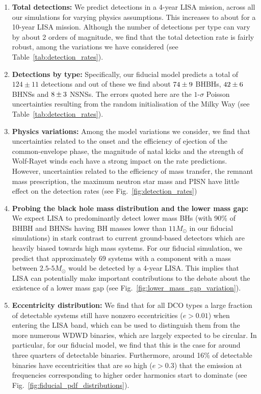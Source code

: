 \begin{enumerate}
    \item \textbf{Total detections:} We predict \rangeFourYear{} detections in a 4-year LISA mission, across all our simulations for varying physics assumptions. This increases to about \rangeTenYear{} for a 10-year LISA mission. Although the number of detections per type can vary by about 2 orders of magnitude, we find that the total detection rate is fairly robust, among the variations we have considered (see Table~\ref{tab:detection_rates}).
    
     \item \textbf{Detections by type:} Specifically, our fiducial model predicts a total of $124 \pm 11$ detections and out of these we find about $74{}\pm 9$ BHBHs, $42{}\pm 6$ BHNSs and $8{}\pm 3$ NSNSs. The errors quoted here are the $1$-$\sigma$ Poisson uncertainties resulting from the random initialisation of the Milky Way (see Table~\ref{tab:detection_rates}).
    
    \item \textbf{Physics variations:}  Among the model variations we consider, we find that uncertainties related to the onset and the efficiency of ejection of the common-envelope phase, the magnitude of natal kicks and the strength of Wolf-Rayet winds each have a strong impact on the rate predictions. However, uncertainties related to the efficiency of mass transfer, the remnant mass prescription, the maximum neutron star mass and PISN have little effect on the detection rates (see Fig.~\ref{fig:detection_rates})
    
    \item \textbf{Probing the black hole mass distribution and the lower mass gap:} We expect LISA to predominantly detect lower mass BHs (with 90\% of BHBH and BHNSs having BH masses lower than $11 \unit{M_\odot}$ in our fiducial simulations) in stark contrast to current ground-based detectors which are heavily biased towards high mass systems. For our fiducial simulation, we predict that approximately 69 systems with a component with a mass between $2.5$-$5 \unit{M_\odot}$ would be detected by a 4-year LISA. This implies that LISA can potentially make important contributions to the debate about the existence of a lower mass gap (see Fig.~\ref{fig:lower_mass_gap_variation}).
    
    \item \textbf{Eccentricity distribution:} We find that for all DCO types a large fraction of detectable systems still have nonzero eccentricities ($e > 0.01$) when entering the LISA band, which can be used to distinguish them from the more numerous WDWD binaries, which are largely expected to be circular. In particular, for our fiducial model, we find that this is the case for around three quarters of detectable binaries. Furthermore, around 16\% of detectable binaries have eccentricities that are so high ($e > 0.3$) that the emission at frequencies corresponding to higher order harmonics start to dominate (see Fig.~\ref{fig:fiducial_pdf_distributions}).
    

\end{enumerate}
